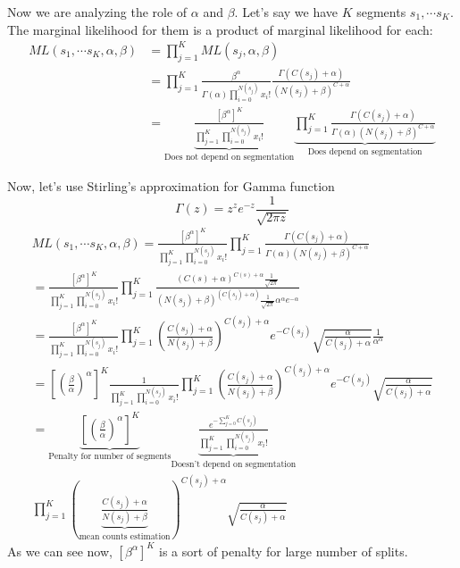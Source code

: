\documentclass{article}
\begin{document}
Now we are analyzing the role of $\alpha$ and $\beta$.
Let's say we have $K$ segments $s_1, \cdots s_K$. The marginal likelihood for them is a product of marginal likelihood for each:
\begin{align*}
    ML(s_1, \cdots s_K, \alpha, \beta) & = \prod _{j=1} ^{K} ML(s_j, \alpha, \beta) \\
    & = 
    \prod _{j=1} ^{K} \frac {\beta^\alpha} {\Gamma(\alpha) \prod _{i=0} ^{N(s_j)} x_i!} \frac {\Gamma(C(s_j)+\alpha)} {(N(s_j)+\beta)^{C+\alpha}} \\
    & = 
    \underbrace {\frac {\left[\beta^{\alpha}\right]^K} {\prod _{j=1} ^{K} \prod _{i=0} ^{N(s_j)} x_i!}}_{\text{Does not depend on segmentation}}
    \underbrace {\prod _{j=1} ^{K}  \frac {\Gamma(C(s_j)+\alpha)} {\Gamma(\alpha)(N(s_j)+\beta)^{C+\alpha}} }_{\text{Does depend on segmentation}}
\end{align*}

Now, let's use Stirling's approximation for Gamma function
$$
\Gamma(z) = z^z e^{-z} \frac 1 {\sqrt{2\pi z}}
$$
\begin{gather*}
    ML(s_1, \cdots s_K, \alpha, \beta)
    = 
    \frac {\left[\beta^{\alpha}\right]^K} {\prod _{j=1} ^{K} \prod _{i=0} ^{N(s_j)} x_i!}
    \prod _{j=1} ^{K}  
    \frac {\Gamma(C(s_j)+\alpha)} {\Gamma(\alpha)(N(s_j)+\beta)^{C+\alpha}} \\
    =
    \frac {\left[\beta^{\alpha}\right]^K} {\prod _{j=1} ^{K} \prod _{i=0} ^{N(s_j)} x_i!}
    \prod _{j=1} ^{K} 
    \frac {(C(s)+\alpha)^{C(s)+\alpha}\frac 1 {\sqrt{2 \pi }}} 
    {(N(s_j)+\beta)^{(C(s_j)+\alpha)}\frac 1 {\sqrt{2 \pi } }\alpha^\alpha e^{-\alpha}}\\
    =
    \frac {\left[\beta^{\alpha}\right]^K} {\prod _{j=1} ^{K} \prod _{i=0} ^{N(s_j)} x_i!}
    \prod _{j=1} ^{K} 
    \left( \frac {C(s_j)+\alpha} {N(s_j)+\beta} \right) ^ {C(s_j)+\alpha} e^{-C(s_j)} \sqrt{\frac \alpha {C(s_j)+\alpha}} \frac 1 {\alpha^\alpha}\\
    =
    \left[\left(\frac {\beta} {\alpha} \right) ^{\alpha}\right]^K \frac {1} {\prod _{j=1} ^{K} \prod _{i=0} ^{N(s_j)} x_i!}
    \prod _{j=1} ^{K} 
    \left( \frac {C(s_j)+\alpha} {N(s_j)+\beta} \right) ^ {C(s_j)+\alpha} e^{-C(s_j)} \sqrt{\frac \alpha {C(s_j)+\alpha}} \\
    =
    \underbrace{
        \left[\left(\frac {\beta} {\alpha} \right) ^{\alpha}\right]^K }_{\text{Penalty for number of segments}} 
    \underbrace{
        \frac {e^{-\sum_{j=0} ^K C(s_j)}} {\prod _{j=1} ^{K} \prod _{i=0} ^{N(s_j)} x_i!}}_{\text{Doesn't depend on segmentation}}\\
    \prod _{j=1} ^{K} 
    \left(\underbrace { \frac {C(s_j)+\alpha} {N(s_j)+\beta}}_{\text{mean counts estimation}} \right) ^ {C(s_j)+\alpha}  \sqrt{\frac \alpha {C(s_j)+\alpha}} 
\end{gather*}
As we can see now, ${\left[\beta^{\alpha}\right]^K}$ is a sort of penalty for large number of splits.
\end{document}
